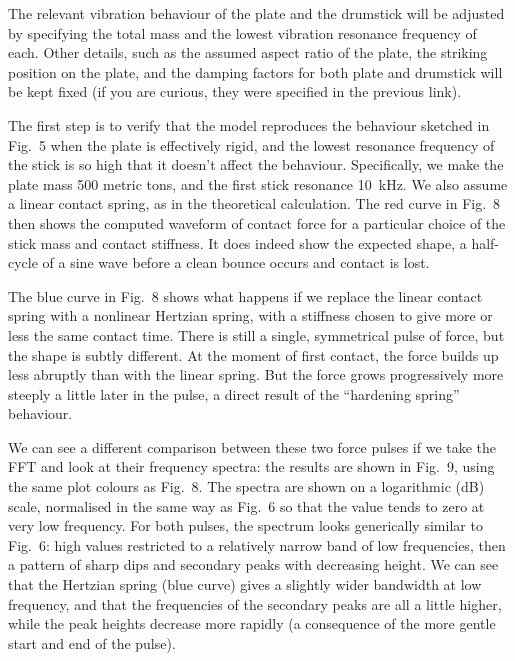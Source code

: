   The relevant vibration behaviour of the plate and the drumstick will be 
  adjusted by specifying the total mass and the lowest vibration resonance 
  frequency of each. Other details, such as the assumed aspect ratio of the 
  plate, the striking position on the plate, and the damping factors for both 
  plate and drumstick will be kept fixed (if you are curious, they were 
  specified in the previous link). 

  The first step is to verify that the model reproduces the behaviour sketched 
  in Fig.\ 5 when the plate is effectively rigid, and the lowest resonance 
  frequency of the stick is so high that it doesn’t affect the behaviour. 
  Specifically, we make the plate mass 500 metric tons, and the first stick 
  resonance 10~kHz. We also assume a linear contact spring, as in the 
  theoretical calculation. The red curve in Fig.\ 8 then shows the computed 
  waveform of contact force for a particular choice of the stick mass and 
  contact stiffness. It does indeed show the expected shape, a half-cycle of a 
  sine wave before a clean bounce occurs and contact is lost. 

  The blue curve in Fig.\ 8 shows what happens if we replace the linear contact 
  spring with a nonlinear Hertzian spring, with a stiffness chosen to give more 
  or less the same contact time. There is still a single, symmetrical pulse of 
  force, but the shape is subtly different. At the moment of first contact, the 
  force builds up less abruptly than with the linear spring. But the force 
  grows progressively more steeply a little later in the pulse, a direct result 
  of the “hardening spring” behaviour. 

  We can see a different comparison between these two force pulses if we take 
  the FFT and look at their frequency spectra: the results are shown in Fig.\ 
  9, using the same plot colours as Fig.\ 8. The spectra are shown on a 
  logarithmic (dB) scale, normalised in the same way as Fig.\ 6 so that the 
  value tends to zero at very low frequency. For both pulses, the spectrum 
  looks generically similar to Fig.\ 6: high values restricted to a relatively 
  narrow band of low frequencies, then a pattern of sharp dips and secondary 
  peaks with decreasing height. We can see that the Hertzian spring (blue 
  curve) gives a slightly wider bandwidth at low frequency, and that the 
  frequencies of the secondary peaks are all a little higher, while the peak 
  heights decrease more rapidly (a consequence of the more gentle start and end 
  of the pulse). 

